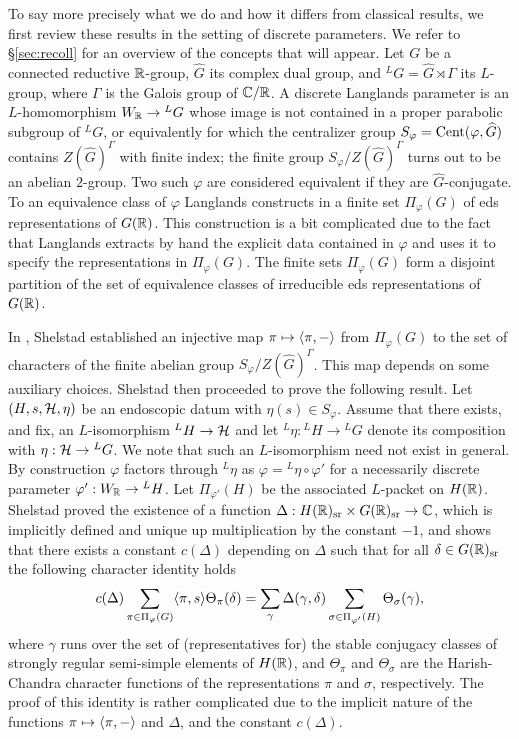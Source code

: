 \documentclass{article}
\theoremstyle{definition}
\numberwithin{equation}{section}
\renewcommand{\-}{\hyp{}}
\begin{document}
To say more precisely what we do and how it differs from classical results, we first review these results in the setting of discrete parameters. We refer to \S\ref{sec:recoll} for an overview of the concepts that will appear. Let $G$ be a connected reductive $\mathbb{R}$-group, $\hat G$ its complex dual group, and $^LG=\hat G \rtimes \Gamma$ its $L$\-group, where $\Gamma$ is the Galois group of $\mathbb{C}/\mathbb{R}$. A discrete Langlands parameter is an $L$\-homomorphism $W_{\mathbb{R}} \to {^LG}$ whose image is not contained in a proper parabolic subgroup of $^LG$, or equivalently for which the centralizer group $S_\varphi=\textrm{Cent}(\varphi,\widehat G)$ contains $Z(\hat G)^\Gamma$ with finite index; the finite group $S_\varphi/Z(\hat G)^\Gamma$ turns out to be an abelian $2$-group. Two such $\varphi$ are considered equivalent if they are $\hat G$-conjugate. To an equivalence class of $\varphi$ Langlands constructs in \cite[\S3]{Lan89} a finite set $\Pi_\varphi(G)$ of eds representations of $G(\mathbb{R})$. This construction is a bit complicated due to the fact that Langlands extracts by hand the explicit data contained in $\varphi$ and uses it to specify the representations in $\Pi_\varphi(G)$. The finite sets $\Pi_\varphi(G)$ form a disjoint partition of the set of equivalence classes of irreducible eds representations of $G(\mathbb{R})$.

In \cite{She82}, Shelstad established an injective map $\pi \mapsto \langle\pi,-\rangle$ from $\Pi_\varphi(G)$ to the set of characters of the finite abelian group $S_\varphi/Z(\hat G)^\Gamma$. This map depends on some auxiliary choices. Shelstad then proceeded to prove the following result. Let $(H,s,\mathcal{H},\eta)$ be an endoscopic datum with $\eta(s) \in S_\varphi$. Assume that there exists, and fix, an $L$\-isomorphism $^LH \to \mathcal{H}$ and let $^L\eta : {^LH} \to {^LG}$ denote its composition with $\eta : \mathcal{H} \to {^LG}$. We note that such an $L$\-isomorphism need not exist in general. By construction $\varphi$ factors through $^L\eta$ as $\varphi = {^L\eta}\circ\varphi'$ for a necessarily discrete parameter $\varphi' : W_{\mathbb{R}} \to {^LH}$. Let $\Pi_{\varphi'}(H)$ be the associated $L$\-packet on $H(\mathbb{R})$. Shelstad proved the existence of a function $\Delta : H(\mathbb{R})_{\textrm{sr}} \times G(\mathbb{R})_{\textrm{sr}} \to \mathbb{C}$, which is implicitly defined and unique up multiplication by the constant $-1$, and shows that there exists a constant $c(\Delta)$ depending on $\Delta$ such that for all $\delta \in G(\mathbb{R})_{\textrm{sr}}$ the following character identity holds
\begin{equation} \label{eq:s1}
c(\Delta)\sum_{\pi \in \Pi_\varphi(G)}\langle\pi,s\rangle\Theta_\pi(\delta) = \sum_\gamma \Delta(\gamma,\delta)\sum_{\sigma \in \Pi_{\varphi'}(H)} \Theta_{\sigma}(\gamma),
\end{equation}
where $\gamma$ runs over the set of (representatives for) the stable conjugacy classes of strongly regular semi-simple elements of $H(\mathbb{R})$, and $\Theta_\pi$ and $\Theta_\sigma$ are the Harish-Chandra character functions of the representations $\pi$ and $\sigma$, respectively. The proof of this identity is rather complicated due to the implicit nature of the functions $\pi \mapsto \langle\pi,-\rangle$ and $\Delta$, and the constant $c(\Delta)$.
\end{document}
